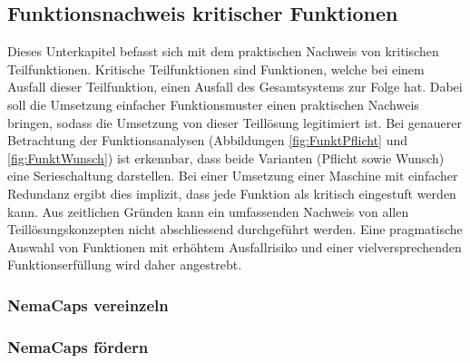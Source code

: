 \subsection{Funktionsnachweis kritischer Funktionen}
Dieses Unterkapitel befasst sich mit dem praktischen Nachweis von kritischen Teilfunktionen. Kritische Teilfunktionen sind Funktionen, welche bei einem Ausfall dieser Teilfunktion, einen Ausfall des Gesamtsystems zur Folge hat. Dabei soll die Umsetzung einfacher Funktionsmuster einen praktischen Nachweis bringen, sodass die Umsetzung von dieser Teillösung legitimiert ist.
\newline
Bei genauerer Betrachtung der Funktionsanalysen (Abbildungen \ref{fig:FunktPflicht} und \ref{fig:FunktWunsch}) ist erkennbar, dass beide Varianten (Pflicht sowie Wunsch) eine Serieschaltung darstellen. Bei einer Umsetzung einer Maschine mit einfacher Redundanz ergibt dies implizit, dass jede Funktion als kritisch eingestuft werden kann. Aus zeitlichen Gründen kann ein umfassenden Nachweis von allen Teillösungskonzepten nicht abschliessend durchgeführt werden. Eine pragmatische Auswahl von Funktionen mit erhöhtem Ausfallrisiko und einer vielversprechenden Funktionserfüllung wird daher angestrebt.

\subsubsection{NemaCaps vereinzeln}
\subsubsection{NemaCaps fördern}
